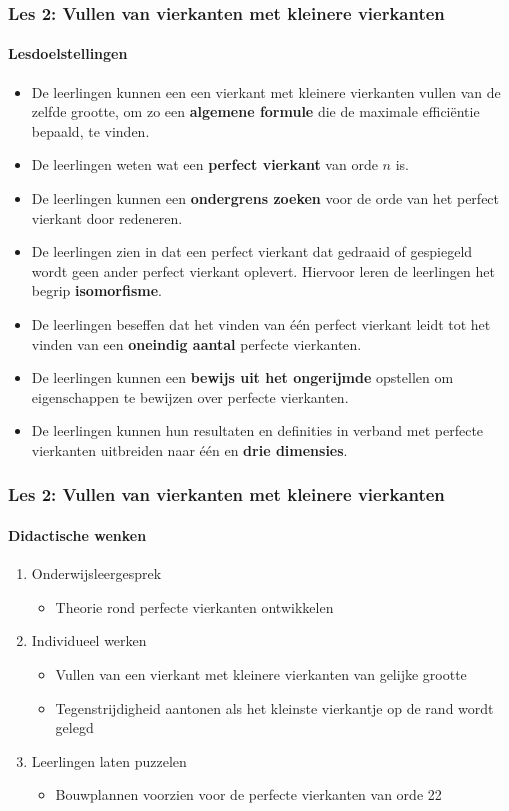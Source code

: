\documentclass[dutch]{beamer}
\begin{document}
\begin{frame}
\frametitle{Les 2: Vullen van vierkanten met kleinere vierkanten}
\framesubtitle{Lesdoelstellingen}
\small
\begin{itemize}
\item De leerlingen kunnen een een vierkant met kleinere vierkanten vullen van de zelfde grootte, om zo een {\bf algemene formule} die de maximale effici\"{e}ntie bepaald, te vinden.
\item De leerlingen weten wat een {\bf perfect vierkant} van orde $n$ is.
\item De leerlingen kunnen een {\bf ondergrens zoeken} voor de orde van het perfect vierkant door redeneren.
\item De leerlingen zien in dat een perfect vierkant dat gedraaid of gespiegeld wordt geen ander perfect vierkant oplevert. Hiervoor leren de leerlingen het begrip {\bf isomorfisme}.
\item De leerlingen beseffen dat het vinden van \'{e}\'{e}n perfect vierkant leidt tot het vinden van een {\bf oneindig aantal} perfecte vierkanten. 
\item De leerlingen kunnen een {\bf bewijs uit het ongerijmde} opstellen om eigenschappen te bewijzen over perfecte vierkanten.
\item De leerlingen kunnen hun resultaten en definities in verband met perfecte vierkanten uitbreiden naar \'{e}\'{e}n en {\bf drie dimensies}.
\end{itemize}
\end{frame}

\begin{frame}
  \frametitle{Les 2: Vullen van vierkanten met kleinere vierkanten}
  \framesubtitle{Didactische wenken}
  \begin{enumerate}
    \item Onderwijsleergesprek
      \begin{itemize}
        \item Theorie rond perfecte vierkanten ontwikkelen
      \end{itemize}
    \item Individueel werken
      \begin{itemize}
        \item Vullen van een vierkant met kleinere vierkanten van gelijke grootte
        \item Tegenstrijdigheid aantonen als het kleinste vierkantje op de rand wordt gelegd
      \end{itemize}
    \item Leerlingen laten puzzelen
      \begin{itemize}
        \item Bouwplannen voorzien voor de perfecte vierkanten van orde 22
      \end{itemize}
  \end{enumerate}
\end{frame}
\end{document}
